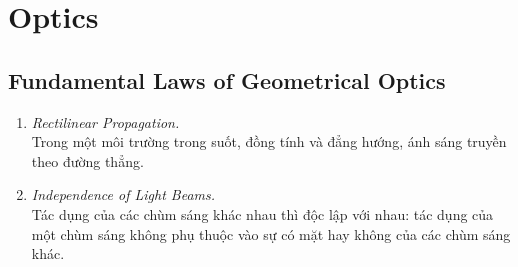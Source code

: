 \chapter{Optics}

\section{Fundamental Laws of Geometrical Optics}
\begin{enumerate}
\item \textit{Rectilinear Propagation.}\\
Trong một môi trường trong suốt, đồng tính và đẳng hướng, ánh sáng truyền theo đường thẳng.

\item \textit{Independence of Light Beams.}\\
Tác dụng của các chùm sáng khác nhau thì độc lập với nhau: tác dụng của một chùm sáng không phụ thuộc vào sự có mặt hay không của các chùm sáng khác.


\end{enumerate}

